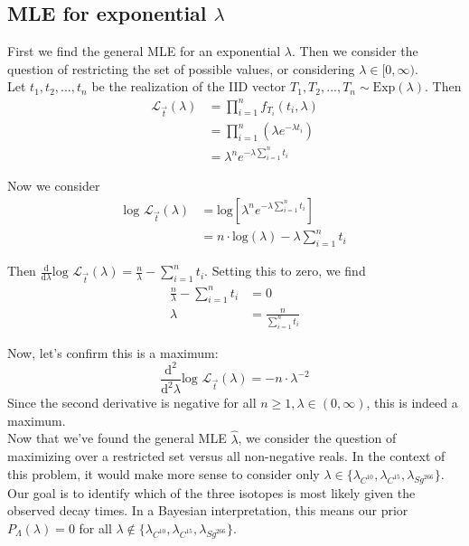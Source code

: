 \documentclass[paper=a4, fontsize=11pt]{scrartcl} %
\numberwithin{equation}{section} %
\numberwithin{figure}{section} %
\numberwithin{table}{section} %
\begin{document}
\subsection{MLE for exponential $\lambda$}

First we find the general MLE for an exponential $\lambda$. Then we consider the question of restricting the set of possible values, or considering $\lambda \in [0,\infty)$. \\

Let $t_1, t_2, ..., t_n$ be the realization of the IID vector $T_1, T_2, ..., T_n \sim \textrm{Exp}(\lambda)$. Then
\begin{align*}
\mathcal{L}_{\vec{t}} (\lambda) &= \prod_{i = 1}^{n} f_{T_i}(t_i, \lambda) \\
   &= \prod_{i = 1}^{n} \left(\lambda e^{-\lambda t_i}\right) \\
   &= \lambda^n e^{-\lambda \sum_{i=1}^n t_i}
\end{align*}

Now we consider
\begin{align*}
\textrm{log } \mathcal{L}_{\vec{t}} (\lambda) &= \textrm{log} \left[ \lambda^n e^{-\lambda \sum_{i=1}^n t_i} \right] \\
   &= n \cdot \textrm{log}(\lambda) - \lambda  \sum_{i=1}^n t_i
\end{align*}

Then $ \frac{\textrm{d}}{\textrm{d}\lambda} \textrm{log } \mathcal{L}_{\vec{t}} (\lambda) = \frac{n}{\lambda} - \sum_{i=1}^n t_i$. Setting this to zero, we find
\begin{align*}
\frac{n}{\lambda} - \sum_{i=1}^n t_i &= 0 \\
\lambda &= \frac{n}{\sum_{i=1}^n t_i}
\end{align*}

Now, let's confirm this is a maximum:
\[\frac{\textrm{d}^2}{\textrm{d}^2 \lambda} \textrm{log } \mathcal{L}_{\vec{t}} (\lambda) = -n \cdot \lambda^{-2}\]
Since the second derivative is negative for all $n \geq 1, \lambda \in (0, \infty)$, this is indeed a maximum. \\

Now that we've found the general MLE  $\hat{\lambda}$, we consider the question of maximizing over a restricted set versus all non-negative reals. In the context of this problem, it would make more sense to consider only $\lambda \in \{\lambda_{C^{10}}, \lambda_{C^{15}}, \lambda_{Sg^{266}}\}$. Our goal is to identify which of the three isotopes is most likely given the observed decay times. In a Bayesian interpretation, this means our prior $P_\Lambda(\lambda) = 0$ for all $\lambda \notin \{\lambda_{C^{10}}, \lambda_{C^{15}}, \lambda_{Sg^{266}}\}$.
\end{document}
